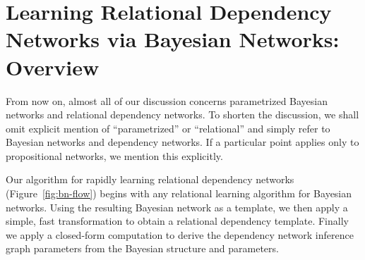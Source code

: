 \documentclass[runningheads,a4paper]{llncs}
\newcommand{\fixneeded}[1]{\textbf{[\footnotesize #1]}}
\newcommand{\iid}{i.i.d.}
\begin{document}
%
%

\section{Learning Relational Dependency Networks via Bayesian Networks: Overview}\label{sect:learning}

From now on, almost all of our discussion concerns parametrized Bayesian networks and relational dependency networks. To shorten the discussion, we shall omit explicit mention of ``parametrized'' or ``relational'' and simply refer to Bayesian networks and dependency networks. If a particular point applies only to propositional networks, we mention this explicitly.

Our algorithm for rapidly learning relational dependency networks (Figure~\ref{fig:bn-flow})
begins with any relational learning algorithm for Bayesian networks. Using the resulting Bayesian network as a template, we then apply a simple, fast transformation to obtain a relational dependency template. Finally we apply a closed-form computation to derive the dependency network inference graph parameters from the Bayesian structure and parameters. %
\end{document}
